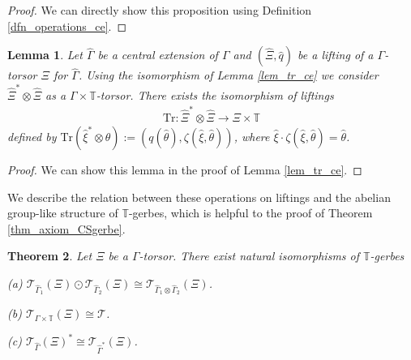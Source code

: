 \documentclass[a4paper,a4paper]{article}
\newtheorem{thm}{Theorem}[section]
\newtheorem{lem}[thm]{Lemma}
\theoremstyle{definition}
\theoremstyle{remark}
\newcommand{\T}{\mathbb{T}}
\newcommand{\sT}{\mathcal{T}}
\newcommand{\Tr}{\mathrm{Tr}}
\newcommand{\hq}{\widehat{q}}
\def\h#1{ \widehat{#1} }
\begin{document}
\begin{proof}
We can directly show this proposition using Definition \ref{dfn_operations_ce}.
\end{proof}


\begin{lem} \label{lem_tr_lifting}
Let $\h{\Gamma}$ be a central extension of $\Gamma$ and $(\h{\Xi}, \hq)$ be a lifting of a $\Gamma$-torsor $\Xi$ for $\h{\Gamma}$. Using the isomorphism of Lemma \ref{lem_tr_ce} we consider $\h{\Xi}^* \otimes \h{\Xi}$ as a $\Gamma \times \T$-torsor. There exists the isomorphism of liftings
\begin{eqnarray*}
\Tr : \h{\Xi}^* \otimes \h{\Xi} \rightarrow \Xi \times \T
\end{eqnarray*}
defined by $\Tr(\h{\xi}^* \otimes \h{\theta}) := (q(\h{\theta}), \zeta(\h{\xi}, \h{\theta}))$, where $\h{\xi} \cdot \zeta(\h{\xi}, \h{\theta}) = \h{\theta}$.
\end{lem}

\begin{proof}
We can show this lemma in the proof of Lemma \ref{lem_tr_ce}.
\end{proof}

We describe the relation between these operations on liftings and the abelian group-like structure of $\T$-gerbes, which is helpful to the proof of Theorem \ref{thm_axiom_CSgerbe}.

\begin{thm} \label{thm_gerbe_lifting}
Let $\Xi$ be a $\Gamma$-torsor. There exist natural isomorphisms of $\T$-gerbes

(a) $\sT_{\h{\Gamma}_1}(\Xi) \odot \sT_{\h{\Gamma}_2}(\Xi) \cong \sT_{\h{\Gamma}_1 \otimes \h{\Gamma}_2}(\Xi)$.

(b) $\sT_{\Gamma \times \T}(\Xi) \cong \sT$.

(c) $\sT_{\h{\Gamma}}(\Xi)^* \cong \sT_{\h{\Gamma}^*}(\Xi)$.
\end{thm}
\end{document}
